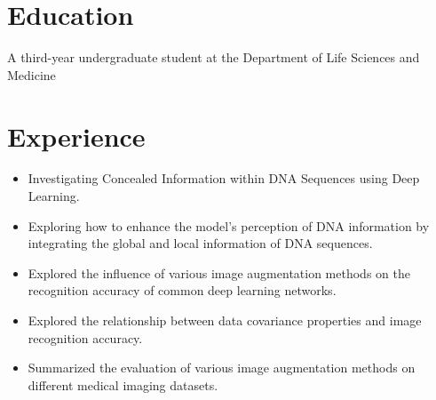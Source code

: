 \documentclass{resume}
\begin{document}



\section{Education}

A third-year undergraduate student at the Department of Life Sciences and Medicine


\section{Experience}

    \begin{itemize}
      \item Investigating Concealed Information within DNA Sequences using Deep Learning.
      \item Exploring how to enhance the model’s perception of DNA information by integrating the global and local information of DNA sequences.
    \end{itemize}

    \begin{itemize}
      \item Explored the influence of various image augmentation methods on the recognition accuracy of common deep learning networks.
      \item Explored the relationship between data covariance properties and image recognition accuracy.
      \item Summarized the evaluation of various image augmentation methods on different medical imaging datasets.
    \end{itemize}
\end{document}
